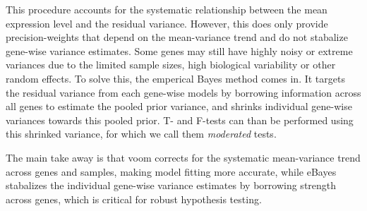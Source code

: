 This procedure accounts for the systematic relationship between the mean expression level and the residual variance.
However, this does only provide precision-weights that depend on the mean-variance trend and do not stabalize gene-wise variance estimates. 
Some genes may still have highly noisy or extreme variances due to the limited sample sizes, high biological variability or other random effects.
To solve this, the emperical Bayes method comes in.
It targets the residual variance from each gene-wise models by borrowing information across all genes to estimate the pooled prior variance, and shrinks individual gene-wise variances towards this pooled prior.
T- and F-tests can than be performed using this shrinked variance, for which we call them \textit{moderated} tests.

The main take away is that voom corrects for the systematic mean-variance trend across genes and samples, making model fitting more accurate, while eBayes stabalizes the individual gene-wise variance estimates by borrowing strength across genes, which is critical for robust hypothesis testing.